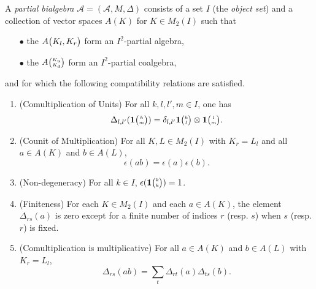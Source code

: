 \begin{Def}\label{DefPartBiAlg} A \emph{partial bialgebra} $\mathscr{A}=(\mathscr{A},M,\Delta)$ consists of a set $I$ (the \emph{object set}) and a collection of vector spaces $A(K)$ for $K\in M_2(I)$ such that 
\begin{itemize}
\item[$\bullet$] the $A{\begin{pmatrix} K_l, K_r\end{pmatrix}}$ form an $I^2$-partial algebra,
\item[$\bullet$] the $A{\tiny {\begin{pmatrix} K_u\\K_d\end{pmatrix}}}$ form an $I^2$-partial coalgebra,
\end{itemize} 
and for which the following compatibility relations are satisfied.
\begin{enumerate}[label=(\alph*)]
\item\label{Propa} (Comultiplication of Units) For all $k,l,l',m\in I$, one has 
\[\Delta_{l,l'}(\mathbf{1}{\tiny {\begin{pmatrix} k\\m\end{pmatrix}}}) = \delta_{l,l'} \mathbf{1}{\tiny {\begin{pmatrix} k\\l\end{pmatrix}}}\otimes \mathbf{1}{\tiny {\begin{pmatrix} l\\m\end{pmatrix}}}.\]  
\item\label{Propb} (Counit of Multiplication) For all $K,L\in M_2(I)$ with $K_r = L_l$ and all $a\in A(K)$ and $b\in A(L)$, \[\epsilon(ab) = \epsilon(a)\epsilon(b).\]%
\item\label{Propc} (Non-degeneracy) For all $k\in I$, $\epsilon(\mathbf{1}{\tiny {\begin{pmatrix} k\\k\end{pmatrix}}})=1$. 
\item\label{Propd} (Finiteness) For each $K\in M_2(I)$ and each $a\in A(K)$, the element $\Delta_{rs}(a)$ is zero except for a finite number of indices $r$ (resp. $s$) when $s$ (resp. $r$) is fixed.
\item\label{Prope} (Comultiplication is multiplicative) For all $a\in A(K)$ and $b\in A(L)$ with $K_r= L_l$,  \[\Delta_{rs}(ab) = \sum_t \Delta_{rt}(a)\Delta_{ts}(b).\]
\end{enumerate}
\end{Def}


